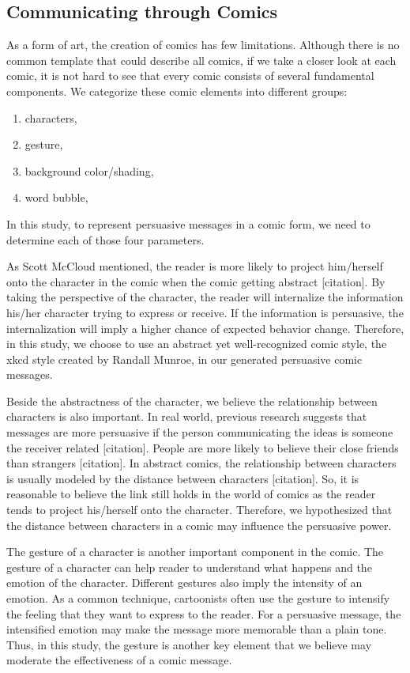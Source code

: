 \subsection{Communicating through Comics}
As a form of art, the creation of comics has few limitations. Although there is no common template that could describe all comics, if we take a closer look at each comic, it is not hard to see that every comic consists of several fundamental components. We categorize these comic elements into different groups:
\begin{enumerate}
 \item	characters,
 \item gesture,
 \item	background color/shading,
 \item	word bubble,
\end{enumerate}\par
In this study, to represent persuasive messages in a comic form, we need to determine each of those four parameters.\par
As Scott McCloud mentioned, the reader is more likely to project him/herself onto the character in the comic when the comic getting abstract [citation]. By taking the perspective of the character, the reader will internalize the information his/her character trying to express or receive. If the information is persuasive, the internalization will imply a higher chance of expected behavior change. Therefore, in this study, we choose to use an abstract yet well-recognized comic style, the xkcd style created by Randall Munroe, in our generated persuasive comic messages.\par
Beside the abstractness of the character, we believe the relationship between characters is also important. In real world, previous research suggests that messages are more persuasive if the person communicating the ideas is someone the receiver related [citation]. People are more likely to believe their close friends than strangers [citation]. In abstract comics, the relationship between characters is usually modeled by the distance between characters [citation]. So, it is reasonable to believe the link still holds in the world of comics as the reader tends to project his/herself onto the character. Therefore, we hypothesized that the distance between characters in a comic may influence the persuasive power.\par
The gesture of a character is another important component in the comic. The gesture of a character can help reader to understand what happens and the emotion of the character. Different gestures also imply the intensity of an emotion. As a common technique, cartoonists often use the gesture to intensify the feeling that they want to express to the reader. For a persuasive message, the intensified emotion may make the message more memorable than a plain tone. Thus, in this study, the gesture is another key element that we believe may moderate the effectiveness of a comic message.\par
